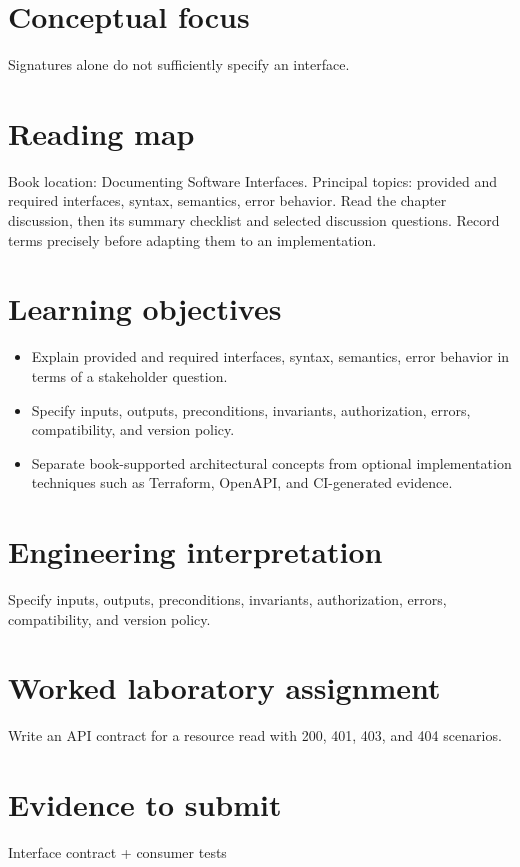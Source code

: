 \documentclass[10pt,letterpaper]{article}
\begin{document}
\DocProvenance
\section{Conceptual focus}
Signatures alone do not sufficiently specify an interface.

\section{Reading map}
Book location: Documenting Software Interfaces. Principal topics: provided and required interfaces, syntax, semantics, error behavior. Read the chapter discussion, then its summary checklist and selected discussion questions. Record terms precisely before adapting them to an implementation.

\section{Learning objectives}
\begin{itemize}
\item Explain provided and required interfaces, syntax, semantics, error behavior in terms of a stakeholder question.
\item Specify inputs, outputs, preconditions, invariants, authorization, errors, compatibility, and version policy.
\item Separate book-supported architectural concepts from optional implementation techniques such as Terraform, OpenAPI, and CI-generated evidence.
\end{itemize}
\section{Engineering interpretation}
Specify inputs, outputs, preconditions, invariants, authorization, errors, compatibility, and version policy.

\section{Worked laboratory assignment}
Write an API contract for a resource read with 200, 401, 403, and 404 scenarios.

\section{Evidence to submit}
Interface contract + consumer tests
\end{document}
